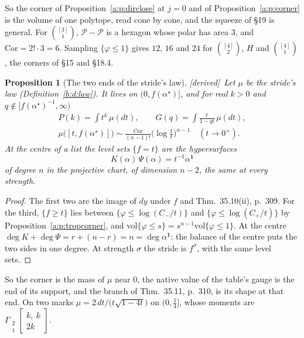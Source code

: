 \documentclass[11pt]{article}
\newcommand{\one}{\mathbf 1}
\newcommand{\Gst}[4]{\Gamma_{\substack{#1\\#2}}\!\begin{bmatrix}#3\\#4\end{bmatrix}}
\theoremstyle{plain}
\newtheorem{proposition}{Proposition}[section]
\theoremstyle{definition}
\theoremstyle{remark}
\newcommand{\derived}{\textup{[derived]}}
\begin{document}
So the corner of Proposition~\ref{a:p:dirclose} at $j=0$ and of Proposition~\ref{a:p:corner} is the volume of one polytope, read cone by cone, and the squeeze of \S19 is general. For $\binom{[3]}1$, $\mathcal P-\mathcal P$ is a hexagon whose polar has area $3$, and $\mathrm{Cor}=2!\cdot3=6$. Sampling $\{\varphi\le1\}$ gives $12$, $16$ and $24$ for $\binom{[4]}2$, $H$ and $\binom{[4]}1$, the corners of \S15 and \S18.4.

\begin{proposition}[The two ends of the stride's law]\label{a:p:stridelaw}\derived\
Let $\mu$ be the stride's law (Definition~\ref{b:d:law}). It lives on $(0,f(\alpha^\star)]$, and for real $k>0$ and $q\notin[f(\alpha^\star)^{-1},\infty)$
\begin{gather*}
P(k)=\int t^k\,\mu(dt),\qquad G(q)=\int\frac{t}{1-qt}\,\mu(dt),\\
\mu\big([t,f(\alpha^\star)]\big)\sim\frac{\mathrm{Cor}}{(n-1)!}\Big(\log\frac1t\Big)^{n-1}\quad(t\to0^+).
\end{gather*}
At the centre of a list the level sets $\{f=t\}$ are the hypersurfaces
\[
K(\alpha)\,\Psi(\alpha)=t^{-1}\alpha^{\one}
\]
of degree $n$ in the projective chart, of dimension $n-2$, the same at every strength.
\end{proposition}

\begin{proof}
The first two are the image of $dy$ under $f$ and Thm.~35.10(ii), p.~309. For the third, $\{f\ge t\}$ lies between $\{\varphi\le\log(C_-/t)\}$ and $\{\varphi\le\log(C_+/t)\}$ by Proposition~\ref{a:p:tropcorner}, and $\mathrm{vol}\{\varphi\le s\}=s^{n-1}\mathrm{vol}\{\varphi\le1\}$. At the centre $\deg K+\deg\Psi=r+(n-r)=n=\deg\alpha^{\one}$: the balance of the centre puts the two sides in one degree. At strength $\sigma$ the stride is $f^\sigma$, with the same level sets.
\end{proof}

So the corner is the mass of $\mu$ near $0$, the native value of the table's gauge is the end of its support, and the branch of Thm.~35.11, p.~310, is its shape at that end. On two marks $\mu=2\,dt/\big(t\sqrt{1-4t}\big)$ on $(0,\frac14]$, whose moments are $\Gst21{k,\ k}{2k}$.
\end{document}
